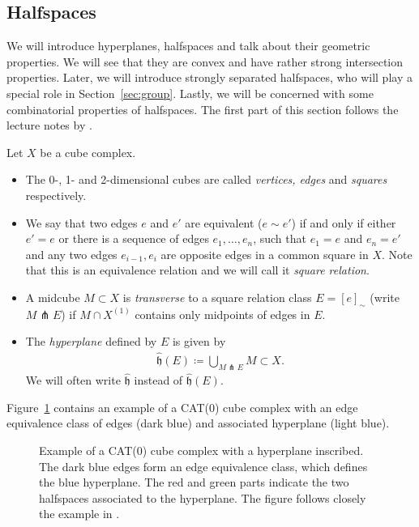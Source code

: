 \subsection{Halfspaces}
\label{sec:halfspaces}
We will introduce hyperplanes, halfspaces and talk about their geometric properties. We will see that they are convex and have rather strong intersection properties. Later, we will introduce strongly separated halfspaces, who will play a special role in Section~\ref{sec:group}. Lastly, we will be concerned with some combinatorial properties of halfspaces. The first part of this section follows the lecture notes by \textcite{Rolli2012}.

\begin{defin}[Hyperplanes]
  Let \(X\) be a cube complex.
  \begin{itemize}
  \item The 0-, 1- and 2-dimensional cubes are called \emph{vertices, edges} and \emph{squares} respectively.
  \item We say that two edges \(e\) and \(e'\) are equivalent (\(e \sim e'\)) if and only if either \(e' = e\) or there is a sequence of edges \(e_1, \dots, e_n\), such that \(e_1 = e\) and \(e_n = e'\) and any two edges \(e_{i-1}, e_i\) are opposite edges in a common square in \(X\). Note that this is an equivalence relation and we will call it \emph{square relation}.
  \item A midcube \(M \subset X\) is \emph{transverse} to a square relation class \(E = [e]_\sim\) (write \(M \pitchfork E\)) if \(M \cap X^{(1)}\) contains only midpoints of edges in \(E\).
  \item The \emph{hyperplane} defined by \(E\) is given by
    \begin{align*}
      \mathfrak{\hat h}(E) \coloneqq \bigcup_{M \pitchfork E} M \subset X.
    \end{align*}
    We will often write \(\mathfrak{\hat h}\) instead of \(\mathfrak{\hat h}(E)\).
  \end{itemize}
\end{defin}

\begin{bsp}
  Figure~\ref{fig:hyperplanes} contains an example of a CAT(0) cube complex with an edge equivalence class of edges (dark blue) and associated hyperplane (light blue). 
  \begin{figure}[htbp]
    \centering
    
    \caption{Example of a CAT(0) cube complex with a hyperplane inscribed. The dark blue edges form an edge equivalence class, which defines the blue hyperplane. The red and green parts indicate the two halfspaces associated to the hyperplane. The figure follows closely the example in \textcite{sageev-lecture-notes}.}
    \label{fig:hyperplanes}
  \end{figure}
\end{bsp}

